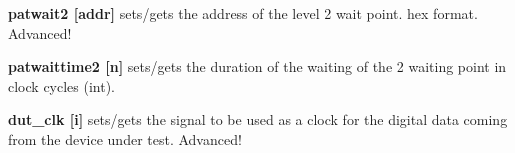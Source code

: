 \begin{DoxyItemize}
\item {\bfseries patwait2 \mbox{[}addr\mbox{]}} sets/gets the address of the level 2 wait point. hex format. Advanced!
\end{DoxyItemize}


\begin{DoxyItemize}
\item {\bfseries patwaittime2 \mbox{[}n\mbox{]}} sets/gets the duration of the waiting of the 2 waiting point in clock cycles (int).
\end{DoxyItemize}


\begin{DoxyItemize}
\item {\bfseries dut\_\-clk \mbox{[}i\mbox{]}} sets/gets the signal to be used as a clock for the digital data coming from the device under test. Advanced! 
\end{DoxyItemize}